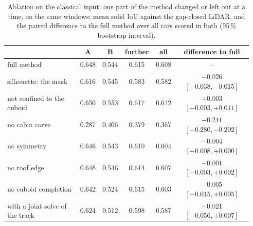 \begin{table}[t]
\centering
\caption{Ablation on the classical input: one part of the method changed or left out at a time, on the same windows; mean solid IoU against the gap-closed LiDAR, and the paired difference to the full method over all cars scored in both (95\,\% bootstrap interval).}
\label{tab:ablation}
\footnotesize
\setlength{\tabcolsep}{3pt}
\begin{tabular}{lccccc}
\toprule
 & A & B & further & all & difference to full \\
\midrule
full method & 0.648 & 0.544 & 0.615 & 0.608 & -- \\
silhouette: the mask & 0.616 & 0.545 & 0.583 & 0.582 & $-0.026$ $[-0.038, -0.015]$ \\
not confined to the cuboid & 0.650 & 0.553 & 0.617 & 0.612 & $+0.003$ $[-0.003, +0.011]$ \\
no cabin carve & 0.287 & 0.406 & 0.379 & 0.367 & $-0.241$ $[-0.280, -0.202]$ \\
no symmetry & 0.646 & 0.543 & 0.610 & 0.604 & $-0.004$ $[-0.008, +0.000]$ \\
no roof edge & 0.648 & 0.546 & 0.614 & 0.607 & $-0.001$ $[-0.003, +0.002]$ \\
no cuboid completion & 0.642 & 0.524 & 0.615 & 0.603 & $-0.005$ $[-0.015, +0.005]$ \\
with a joint solve of the track & 0.624 & 0.512 & 0.598 & 0.587 & $-0.021$ $[-0.056, +0.007]$ \\
\bottomrule
\end{tabular}
\end{table}
